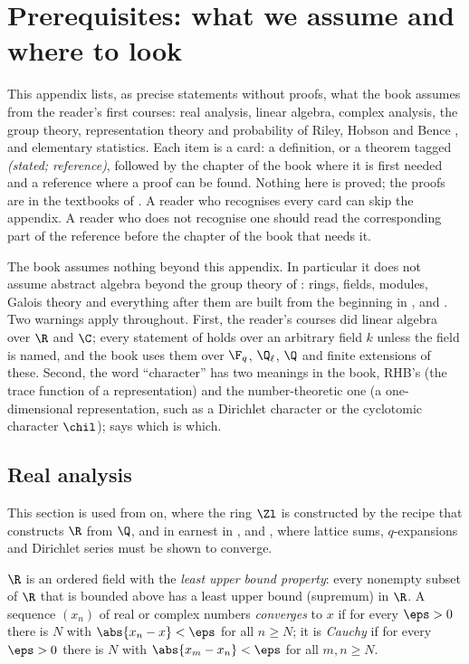 \chapter{Prerequisites: what we assume and where to look}\label{ch:prereq}

This appendix lists, as precise statements without proofs, what the book assumes from the reader's
first courses: real analysis, linear algebra, complex analysis, the group theory, representation
theory and probability of Riley, Hobson and Bence \cite{RHB06}, and elementary statistics. Each
item is a card: a definition, or a theorem tagged \emph{(stated; reference)}, followed by the
chapter of the book where it is first needed and a reference where a proof can be found. Nothing
here is proved; the proofs are in the textbooks of . A reader who recognises
every card can skip the appendix. A reader who does not recognise one should read the corresponding
part of the reference before the chapter of the book that needs it.

The book assumes nothing beyond this appendix. In particular it does not assume abstract algebra
beyond the group theory of : rings, fields, modules, Galois theory and
everything after them are built from the beginning in ,  and
. Two warnings apply throughout. First, the reader's courses did linear algebra over
$\R$ and $\C$; every statement of  holds over an arbitrary field $k$ unless
the field is named, and the book uses them over $\F_q$, $\Q_\ell$, $\Q$ and finite extensions of
these. Second, the word ``character'' has two meanings in the book, RHB's (the trace function of a
representation) and the number-theoretic one (a one-dimensional representation, such as a Dirichlet
character or the cyclotomic character $\chil$);  says which is which.

\section{Real analysis}\label{sec:prereq:real}

This section is used from  on, where the ring $\Zl$ is constructed by the recipe
that constructs $\R$ from $\Q$, and in earnest in ,  and
, where lattice sums, $q$-expansions and Dirichlet series must be shown to
converge.

\begin{definition}\label{def:prereq:completeness}
$\R$ is an ordered field with the \emph{least upper bound property}: every nonempty subset of $\R$
that is bounded above has a least upper bound (supremum) in $\R$. A sequence $(x_n)$ of real or
complex numbers \emph{converges} to $x$ if for every $\eps>0$ there is $N$ with $\abs{x_n-x}<\eps$
for all $n\ge N$; it is \emph{Cauchy} if for every $\eps>0$ there is $N$ with $\abs{x_m-x_n}<\eps$
for all $m,n\ge N$.
\end{definition}

